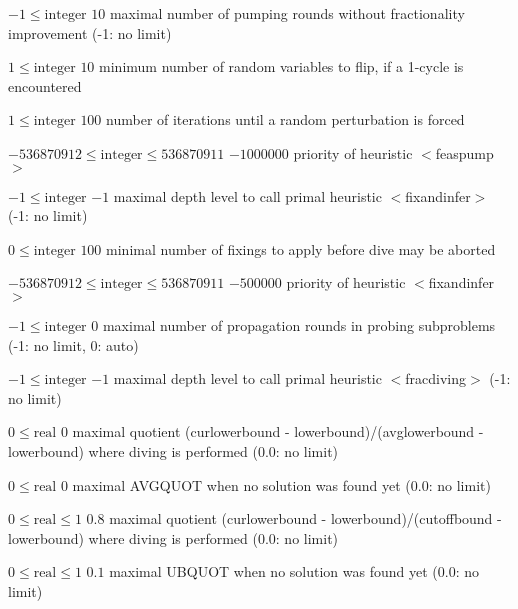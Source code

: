 %
{$-1\leq\textrm{integer}$}%
{$10$}%
{maximal number of pumping rounds without fractionality improvement (-1: no limit)}%
{}

%
{$1\leq\textrm{integer}$}%
{$10$}%
{minimum number of random variables to flip, if a 1-cycle is encountered}%
{}

%
{$1\leq\textrm{integer}$}%
{$100$}%
{number of iterations until a random perturbation is forced}%
{}

%
{$-536870912\leq\textrm{integer}\leq536870911$}%
{$-1000000$}%
{priority of heuristic $<$feaspump$>$}%
{}

%
{$-1\leq\textrm{integer}$}%
{$-1$}%
{maximal depth level to call primal heuristic $<$fixandinfer$>$ (-1: no limit)}%
{}

%
{$0\leq\textrm{integer}$}%
{$100$}%
{minimal number of fixings to apply before dive may be aborted}%
{}

%
{$-536870912\leq\textrm{integer}\leq536870911$}%
{$-500000$}%
{priority of heuristic $<$fixandinfer$>$}%
{}

%
{$-1\leq\textrm{integer}$}%
{$0$}%
{maximal number of propagation rounds in probing subproblems (-1: no limit, 0: auto)}%
{}

%
{$-1\leq\textrm{integer}$}%
{$-1$}%
{maximal depth level to call primal heuristic $<$fracdiving$>$ (-1: no limit)}%
{}

%
{$0\leq\textrm{real}$}%
{$0$}%
{maximal quotient (curlowerbound - lowerbound)/(avglowerbound - lowerbound) where diving is performed (0.0: no limit)}%
{}

%
{$0\leq\textrm{real}$}%
{$0$}%
{maximal AVGQUOT when no solution was found yet (0.0: no limit)}%
{}

%
{$0\leq\textrm{real}\leq1$}%
{$0.8$}%
{maximal quotient (curlowerbound - lowerbound)/(cutoffbound - lowerbound) where diving is performed (0.0: no limit)}%
{}

%
{$0\leq\textrm{real}\leq1$}%
{$0.1$}%
{maximal UBQUOT when no solution was found yet (0.0: no limit)}%
{}

